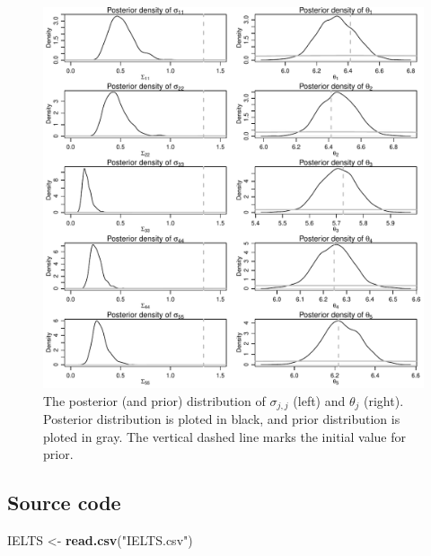 \documentclass[12pt]{article}
\newenvironment{Shaded}{\begin{snugshade}}{\end{snugshade}}
\newcommand{\FunctionTok}[1]{\textcolor[rgb]{0.13,0.29,0.53}{\textbf{#1}}}
\newcommand{\NormalTok}[1]{#1}
\newcommand{\OtherTok}[1]{\textcolor[rgb]{0.56,0.35,0.01}{#1}}
\newcommand{\StringTok}[1]{\textcolor[rgb]{0.31,0.60,0.02}{#1}}
\begin{document}
\begin{figure}[h!]
	\centering
	\includegraphics[width=.9\textwidth]{pic/0.30/Posterior_vs_Prior.pdf}
	\caption{The posterior (and prior) distribution of $\sigma_{j, j}$ (left) and $\theta_j$ (right). Posterior distribution is ploted in black, and prior distribution is ploted in gray. The vertical dashed line marks the initial value for prior.}
	\label{fig:0.30-Posterior_vs_Prior}
\end{figure}

\newpage

\subsection{Source code}

\begin{Shaded}
\begin{Highlighting}[]
\NormalTok{IELTS }\OtherTok{\textless{}{-}} \FunctionTok{read.csv}\NormalTok{(}\StringTok{"IELTS.csv"}\NormalTok{)}
\end{Highlighting}
\end{Shaded}
\end{document}
